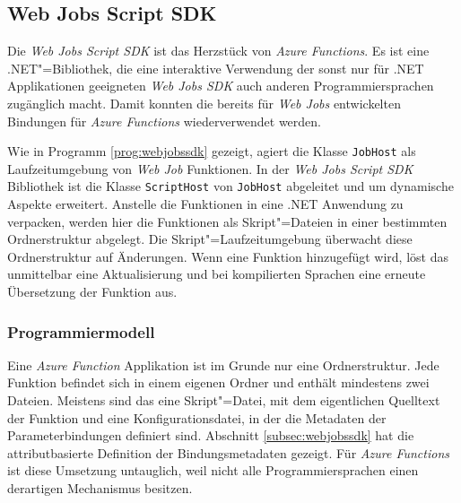 \subsection{Web Jobs Script SDK}
\label{subsec:webjobsscriptsdk}

Die \textit{Web Jobs Script SDK} ist das Herzstück von \textit{Azure Functions}. Es ist eine .NET"=Bibliothek, die eine interaktive Verwendung der sonst nur für .NET Applikationen geeigneten \textit{Web Jobs SDK} auch anderen Programmiersprachen zugänglich macht. Damit konnten die bereits für \textit{Web Jobs} entwickelten Bindungen für \textit{Azure Functions} wiederverwendet werden.

Wie in Programm \ref{prog:webjobssdk} gezeigt, agiert die Klasse \lstinline{JobHost} als Laufzeitumgebung von \textit{Web Job} Funktionen. In der \textit{Web Jobs Script SDK} Bibliothek ist die Klasse \lstinline{ScriptHost} von \lstinline{JobHost} abgeleitet und um dynamische Aspekte erweitert. Anstelle die Funktionen in eine .NET Anwendung zu verpacken, werden hier die Funktionen als Skript"=Dateien in einer bestimmten Ordnerstruktur abgelegt. Die Skript"=Laufzeitumgebung überwacht diese Ordnerstruktur auf Änderungen. Wenn eine Funktion hinzugefügt wird, löst das unmittelbar eine Aktualisierung und bei kompilierten Sprachen eine erneute Übersetzung der Funktion aus.

\subsubsection{Programmiermodell}

Eine \textit{Azure Function} Applikation ist im Grunde nur eine Ordnerstruktur. Jede Funktion befindet sich in einem eigenen Ordner und enthält mindestens zwei Dateien. Meistens sind das eine Skript"=Datei, mit dem eigentlichen Quelltext der Funktion und eine Konfigurationsdatei, in der die Metadaten der Parameterbindungen definiert sind. Abschnitt \ref{subsec:webjobssdk} hat die attributbasierte Definition der Bindungsmetadaten gezeigt. Für \textit{Azure Functions} ist diese Umsetzung untauglich, weil nicht alle Programmiersprachen einen derartigen Mechanismus besitzen.

